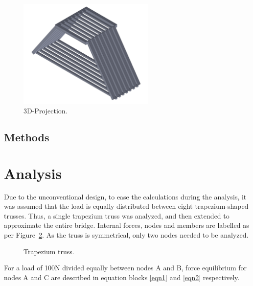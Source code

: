\documentclass[12pt]{article}
\begin{document}
		\begin{figure}[h!]
			\centering
			\includegraphics[width=0.6\textwidth]{proj}
			\caption{3D-Projection.}
			\label{proj}
		\end{figure}


		\subsection{Methods}


	\section{Analysis}

		Due to the unconventional design, to ease the calculations during the analysis, it was assumed that the load is equally distributed between eight trapezium-shaped trusses. Thus, a single trapezium truss was analyzed, and then extended to approximate the entire bridge. Internal forces, nodes and members are labelled as per Figure~\ref{trap}. As the truss is symmetrical, only two nodes needed to be analyzed.

		\begin{figure}[h!]
			\centering
			\caption{Trapezium truss.}
			\label{trap}
		\end{figure}

		For a load of 100N divided equally between nodes A and B, force equilibrium for nodes A and C are described in equation blocks \ref{eqn1} and \ref{eqn2} respectively.
\end{document}
